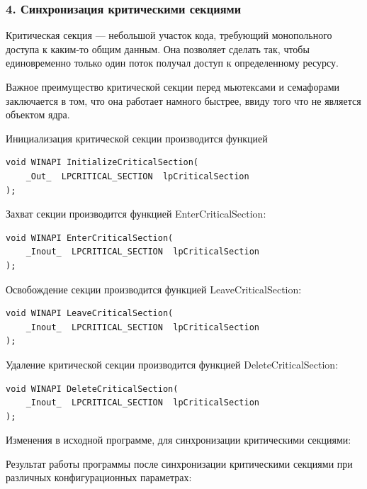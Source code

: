 \documentclass[14pt,a4paper,report]{report}
\begin{document}
\subsubsection{4. Синхронизация критическими секциями}

Критическая секция — небольшой участок кода, требующий монопольного доступа к каким-то общим данным. Она позволяет сделать так, чтобы единовременно только один поток получал доступ к определенному ресурсу.

Важное преимущество критической секции перед мьютексами и семафорами заключается в том, что она работает намного быстрее, ввиду того что не является объектом ядра.

Инициализация критической секции производится функцией 

\begin{verbatim}
void WINAPI InitializeCriticalSection(
    _Out_  LPCRITICAL_SECTION  lpCriticalSection
);
\end{verbatim}

Захват секции производится функцией EnterCriticalSection:

\begin{verbatim}
void WINAPI EnterCriticalSection(
    _Inout_  LPCRITICAL_SECTION  lpCriticalSection
);
\end{verbatim}

Освобождение секции производится функцией LeaveCriticalSection:

\begin{verbatim}
void WINAPI LeaveCriticalSection(
    _Inout_  LPCRITICAL_SECTION  lpCriticalSection
);
\end{verbatim}

Удаление критической секции производится функцией DeleteCriticalSection:

\begin{verbatim}
void WINAPI DeleteCriticalSection(
    _Inout_  LPCRITICAL_SECTION  lpCriticalSection
);
\end{verbatim}

Изменения в исходной программе, для синхронизации критическими секциями:



Результат работы программы после синхронизации критическими секциями при различных конфигурационных параметрах:
\end{document}
